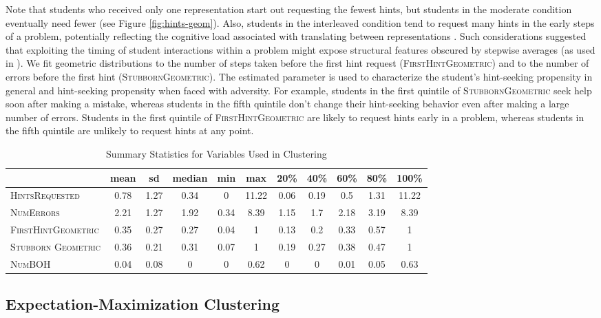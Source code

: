 \documentclass{edm_template}
\newcommand{\ftr}[1]{\textsc{#1}}
\begin{document}
Note that students who received only one representation start out requesting the fewest hints, but students in the moderate condition eventually need fewer  (see Figure \ref{fig:hints-geom}). Also, students in the interleaved condition tend to request many hints in the early steps of a problem, potentially reflecting the cognitive load associated with translating between representations \cite{Ainsworth1999}. Such considerations suggested that exploiting the timing of student interactions within a problem might expose structural features obscured by stepwise averages (as used in \cite{Rau2012}).  We fit geometric distributions to the number of steps taken before the first hint request (\ftr{FirstHintGeometric}) and to the number of errors before the first hint (\ftr{StubbornGeometric}). The estimated parameter is used to characterize the student's hint-seeking propensity in general and hint-seeking propensity when faced with adversity. For example, students in the first quintile of \ftr{StubbornGeometric} seek help soon after making a mistake, whereas students in the fifth quintile don't change their hint-seeking behavior even after making a large number of errors. Students in the first quintile of \ftr{FirstHintGeometric} are likely to request hints early in a problem, whereas students in the fifth quintile are unlikely to request hints at any point.
\begin{table}[htbp]
\caption{Summary Statistics for Variables Used in Clustering}
\begin{center}
\begin{tabular}{| l || c | c || c | c | c || c | c | c | c | c |}
\hline
&mean& sd&median&min&max&20\%&40\%&60\%&	80\%&100\%\\ \hline \hline
\ftr{HintsRequested}&0.78&1.27&0.34&0&11.22&0.06&0.19&0.5&1.31&11.22\\ \hline
\ftr{NumErrors}&2.21&1.27&1.92&0.34&8.39&1.15&1.7&2.18&3.19&8.39\\ \hline 
\ftr{FirstHintGeometric}&0.35&0.27&0.27&0.04&1&0.13&0.2&0.33&0.57&1\\ \hline
\ftr{Stubborn Geometric}&0.36&0.21&0.31&0.07&1&0.19&0.27&0.38&0.47&1\\ \hline
\ftr{NumBOH}&0.04&0.08&0&0&0.62&0&0&0.01&0.05&0.63\\ \hline
 \end{tabular}
\end{center}
\label{tab:sumstats}
\end{table}

\subsection{Expectation-Maximization Clustering}
\label{sec:EM-clust}
\end{document}
